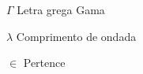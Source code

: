 %
%

\begin{simbolos}
	\item[$ \Gamma $] Letra grega Gama
	\item[$ \lambda $] Comprimento de ondada
	\item[$ \in $] Pertence
\end{simbolos}
